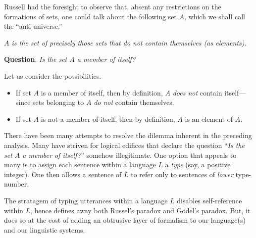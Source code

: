 Russell had the foresight to observe that, absent any restrictions on
the formations of sets, one could talk about the following set $A$,
which we shall call the ``anti-universe.''

\smallskip

{\em $A$ is the set of precisely those sets that {\em do not} contain themselves
  (as elements).}

\medskip

\noindent
{\bf Question}.  {\it Is the set $A$ a member of itself?}

\noindent
Let us consider the possibilities.
\begin{itemize}
\item
If set $A$ is a member of itself, then by definition, $A$ {\em does
  not} contain itself---since sets belonging to $A$ {\em do not}
contain themselves.

\item
If set $A$ is not a member of itself, then by definition, $A$ is an
element of $A$.
\end{itemize}

There have been many attempts to resolve the dilemma inherent in the
preceding analysis.  Many have striven for logical edifices that
declare the question ``{\it Is the set $A$ a member of itself?}''
somehow illegitimate.  One option that appeals to many is to assign
each sentence within a language $L$ a {\it type}
(say, a positive integer).  One then allows a sentence of $L$ to refer only to
sentences of {\em lower} type-number.

The stratagem of typing utterances within a language $L$ disables
self-reference within $L$, hence defines away both Russel's paradox
and G\"{o}del's paradox. But, it does so at the cost of adding an
obtrusive layer of formalism to our language(s) and our linguistic
systems.
